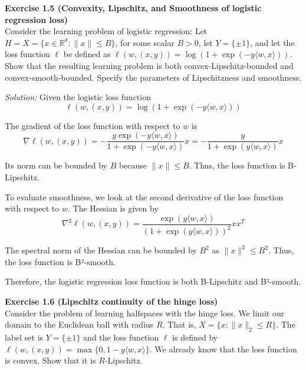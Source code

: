 \documentclass[
	10pt, %
	a4paper, %
	oneside, %
	headinclude,footinclude, %
	BCOR5mm, %
]{scrartcl}
\newenvironment{problem}[2][]
{ \begin{mdframed}[backgroundcolor=gray!20] \textbf{#1 #2} \\}
		{  \end{mdframed}}
\newenvironment{solution}
{\textit{Solution:}}
{}
\begin{document}
\begin{problem}{Exercise 1.5 (Convexity, Lipschitz, and Smoothness of logistic regression loss)}
Consider the learning problem of logistic regression: Let $H = X = \{x \in \mathbb{R}^d : \|x\| \leq B\}$, for some scalar $B > 0$, let $Y = \{\pm1\}$, and let the loss function $\ell$ be defined as $\ell(w, (x, y)) = \log(1 + \exp(-y\langle w, x \rangle))$. Show that the resulting learning problem is both convex-Lipschitz-bounded and convex-smooth-bounded. Specify the parameters of Lipschitzness and smoothness.
\end{problem}

\begin{solution}
	Given the logistic loss function
	\[\ell(w, (x, y)) = \log(1 + \exp(-y\langle w, x \rangle))\]

	The gradient of the loss function with respect to $w$ is
	\[\nabla \ell(w, (x, y)) = -\frac{y \exp(-y\langle w, x \rangle)}{1+\exp(-y\langle w, x \rangle)}x = -\frac{y}{1+\exp(y\langle w, x \rangle)}x\]

	Its norm can be bounded by $B$ because $\|x\| \leq B$. Thus, the loss function is B-Lipschitz.

	To evaluate smoothness, we look at the second derivative of the loss function with respect to $w$. The Hessian is given by
	\[\nabla^2 \ell(w, (x, y)) = \frac{\exp(y\langle w, x \rangle)}{(1+{\exp(y\langle w, x \rangle)})^2} x x^T \]

	The spectral norm of the Hessian can be bounded by $B^2$ as $\|x\|^2 \leq B^2$. Thus, the loss function is B²-smooth.

	Therefore, the logistic regression loss function is both B-Lipschitz and B²-smooth.
\end{solution}

\begin{problem}{Exercise 1.6 (Lipschitz continuity of the hinge loss)}
Consider the problem of learning halfspaces with the hinge loss. We limit our domain to the Euclidean ball with radius $R$. That is, $X = \{x : \|x\|_2 \leq R\}$. The label set is $Y = \{\pm1\}$ and the loss function $\ell$ is defined by $\ell(w, (x, y)) = \max\{0, 1 - y\langle w, x \rangle\}$. We already know that the loss function is convex. Show that it is $R$-Lipschitz.
\end{problem}
\end{document}
